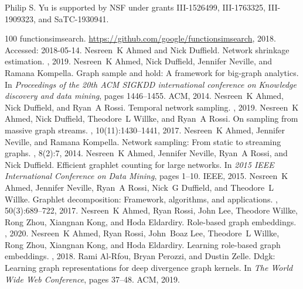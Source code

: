 Philip S. Yu is supported by NSF under grants III-1526499, III-1763325, III-1909323, and SaTC-1930941.

\begin{thebibliography}{100}
functionsimsearch.
\newblock \url{https://github.com/google/functionsimsearch}, 2018.
\newblock Accessed: 2018-05-14.
Nesreen~K Ahmed and Nick Duffield.
\newblock Network shrinkage estimation.
, 2019.
Nesreen~K Ahmed, Nick Duffield, Jennifer Neville, and Ramana Kompella.
\newblock Graph sample and hold: A framework for big-graph analytics.
\newblock In {\em Proceedings of the 20th ACM SIGKDD international conference
  on Knowledge discovery and data mining}, pages 1446--1455. ACM, 2014.
Nesreen~K Ahmed, Nick Duffield, and Ryan~A Rossi.
\newblock Temporal network sampling.
, 2019.
Nesreen~K Ahmed, Nick Duffield, Theodore~L Willke, and Ryan~A Rossi.
\newblock On sampling from massive graph streams.
, 10(11):1430--1441, 2017.
Nesreen~K Ahmed, Jennifer Neville, and Ramana Kompella.
\newblock Network sampling: From static to streaming graphs.
,
  8(2):7, 2014.
Nesreen~K Ahmed, Jennifer Neville, Ryan~A Rossi, and Nick Duffield.
\newblock Efficient graphlet counting for large networks.
\newblock In {\em 2015 IEEE International Conference on Data Mining}, pages
  1--10. IEEE, 2015.
Nesreen~K Ahmed, Jennifer Neville, Ryan~A Rossi, Nick~G Duffield, and
  Theodore~L Willke.
\newblock Graphlet decomposition: Framework, algorithms, and applications.
, 50(3):689--722, 2017.
Nesreen~K Ahmed, Ryan Rossi, John Lee, Theodore Willke, Rong Zhou, Xiangnan
  Kong, and Hoda Eldardiry.
\newblock Role-based graph embeddings.
, 2020.
Nesreen~K Ahmed, Ryan Rossi, John~Boaz Lee, Theodore~L Willke, Rong Zhou,
  Xiangnan Kong, and Hoda Eldardiry.
\newblock Learning role-based graph embeddings.
, 2018.
Rami Al-Rfou, Bryan Perozzi, and Dustin Zelle.
\newblock Ddgk: Learning graph representations for deep divergence graph
  kernels.
\newblock In {\em The World Wide Web Conference}, pages 37--48. ACM, 2019.

\end{thebibliography}
